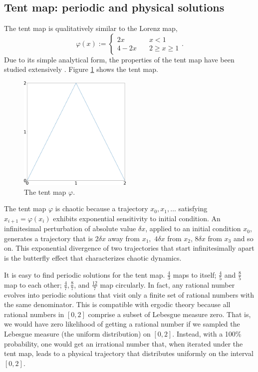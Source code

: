 \subsection{Tent map: periodic and physical solutions}
\label{sec:tent}
The tent map is qualitatively similar
to the Lorenz map,
\begin{equation} \label{tentmap}
    \varphi(x) := \begin{cases}
    2x \quad & x < 1 \\
    4 - 2x \quad & 2 \ge x \ge 1
    \end{cases}.
\end{equation}
Due to its simple analytical form, the properties of the tent map have been studied extensively \cite{tent1}\cite{tent2}. Figure \ref{fig:tent_map} shows the tent map.
\begin{figure}\centering
\includegraphics[width=0.48\textwidth]{tent_map.png}
\caption{The tent map $\varphi$.}
\label{fig:tent_map}
\end{figure}

The tent map $\varphi$ is chaotic because a trajectory $x_0,x_1,\ldots$ satisfying
$x_{i+1} = \varphi(x_i)$ exhibits exponential sensitivity to initial condition. An infinitesimal perturbation of absolute value $\delta x$, applied to an initial condition $x_0$, generates a trajectory that is $2 \delta x$ away from $x_1,$ $4 \delta x$ from $x_2$, $8 \delta x$ from $x_3$ and so on. This exponential divergence of two trajectories that start infinitesimally apart is the butterfly effect that characterizes
chaotic dynamics.

It is easy to find periodic solutions for the tent map.
$\frac43$ maps to itself; $\frac45$ and $\frac85$ map to each other;
$\frac47, \frac87$, and $\frac{12}7$ map circularly.  In fact, any rational number evolves into periodic solutions that visit
only a finite set of rational numbers with the same denominator.
This is compatible
with ergodic theory because all rational numbers in $[0,2]$ comprise a subset of Lebesgue measure zero. That is, we would have zero likelihood of getting a
rational number if we sampled the Lebesgue measure (the uniform distribution) on $[0,2]$.  Instead, with a 100\% probability, one would get an irrational number
that, when iterated under the tent map, leads to a physical trajectory that distributes uniformly on the interval $[0,2]$.

